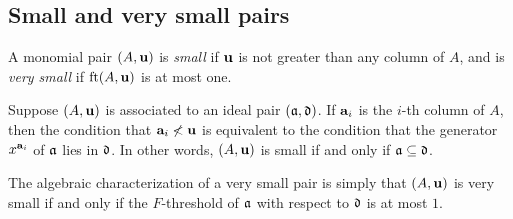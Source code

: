 \documentclass[11pt]{amsart}
\begin{document}
\subsection{Small and very small pairs}

\begin{definition}
A monomial pair $(A, \mathbf{u})$ is \emph{small} if $\mathbf{u}$ is not greater than any column of $A$, and is \emph{very small} if $\operatorname{ft}(A, \mathbf{u})$ is at most one. 
\end{definition}

\begin{remark}
\label{algebraic small and very small: R}
  Suppose $(A, \mathbf{u})$ is associated to an ideal pair $(\mathfrak{a}, \mathfrak{d})$.  If $\mathbf{a}_i$ is the $i$-th column of $A$, then the condition that $\mathbf{a}_i \not < \mathbf{u}$ is equivalent to the condition that the generator $x^{\mathbf{a}_i}$ of $\mathfrak{a}$ lies in $\mathfrak{d}$.  In other words, $(A, \mathbf{u})$ is small if and only if $\mathfrak{a} \subseteq \mathfrak{d}$.

The algebraic characterization of a very small pair is simply that $(A, \mathbf{u})$ is very small if and only if the $F$-threshold of $\mathfrak{a}$ with respect to $\mathfrak{d}$ is at most $1$.
\end{remark}
\end{document}
